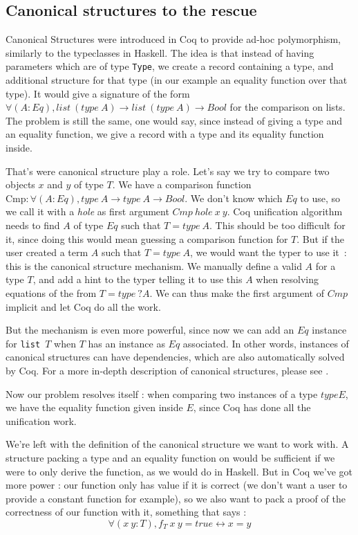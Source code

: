 \documentclass{article}
\begin{document}
\subsection{Canonical structures to the rescue}

Canonical Structures were introduced in Coq to provide ad-hoc polymorphism,
similarly to the typeclasses in Haskell. The idea is that instead of having
parameters which are of type \texttt{Type}, we create a record containing
a type, and additional structure for that type (in our example an equality
function over that type). It would give a signature of the form
$\forall (A : Eq), list~(type~A) \rightarrow list~(type~A) \rightarrow Bool$ for the comparison
on lists. The problem is still the same, one would say, since instead of
giving a type and an equality function, we give a record with a type and its
equality function inside.

That's were canonical structure play a role. Let's say we try to compare two
objects $x$ and $y$ of type $T$. We have a comparison function $\text{Cmp} : \forall (A : Eq),
type~A \rightarrow type~A \rightarrow Bool$. We don't know which $Eq$ to use,
so we call it with a \emph{hole} as first argument $Cmp~hole~x~y$. Coq
unification algorithm needs to find $A$ of type $Eq$ such that $T = type~A$.
This should be too difficult for it, since doing this would mean guessing a
comparison function for $T$. But if the user created a term $A$ such that $T = type~A$,
we would want the typer to use it~: this is the canonical structure
mechanism. We manually define a valid $A$ for a type $T$, and add a hint to the
typer telling it to use this $A$ when resolving equations of the from $T = type~?A$.
We can thus make the first argument of $Cmp$ implicit and let Coq do all the work.

But the mechanism is even more powerful, since now we can add an $Eq$ instance
for \texttt{list $T$} when $T$ has an instance as $Eq$ associated. In other
words, instances of canonical structures can have dependencies, which are
also automatically solved by Coq. For a more in-depth description of canonical
structures, please see \cite{CSCoq13}.

Now our problem resolves itself : when comparing two instances of a type $type E$,
we have the equality function given inside $E$, since Coq has done all the
unification work.

We're left with the definition of the canonical structure we want to work with.
A structure packing a type and an equality function on would be sufficient
if we were to only derive the function, as we would do in Haskell. But in Coq
we've got more power : our function only has value if it is correct (we don't
want a user to provide a constant function for example), so we also want to
pack a proof of the correctness of our function with it, something that
says :
\[\forall (x\ y : T), f_T\ x\ y = true \leftrightarrow x = y\]
\end{document}
